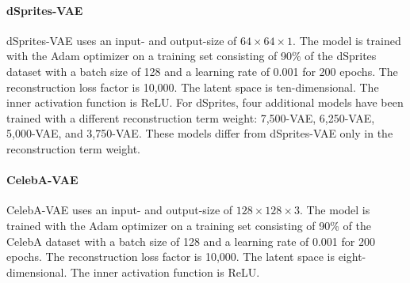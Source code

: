 \paragraph{dSprites-\ac{VAE}} dSprites-\ac{VAE} uses an input- and output-size of $64\times 64\times 1$.
The model is trained with the Adam optimizer on a training set consisting of 90\% of the dSprites dataset with a batch size of 128 and a learning rate of 0.001 for 200 epochs.
The reconstruction loss factor is 10,000.
The latent space is ten-dimensional.
The inner activation function is ReLU.
For dSprites, four additional models have been trained with a different reconstruction term weight: 7,500-\ac{VAE}, 6,250-\ac{VAE}, 5,000-\ac{VAE}, and 3,750-\ac{VAE}.
These models differ from dSprites-\ac{VAE} only in the reconstruction term weight.

\paragraph{CelebA-\ac{VAE}} CelebA-\ac{VAE} uses an input- and output-size of $128\times 128\times 3$.
The model is trained with the Adam optimizer on a training set consisting of 90\% of the CelebA dataset with a batch size of 128 and a learning rate of 0.001 for 200 epochs.
The reconstruction loss factor is 10,000.
The latent space is eight-dimensional.
The inner activation function is ReLU.

